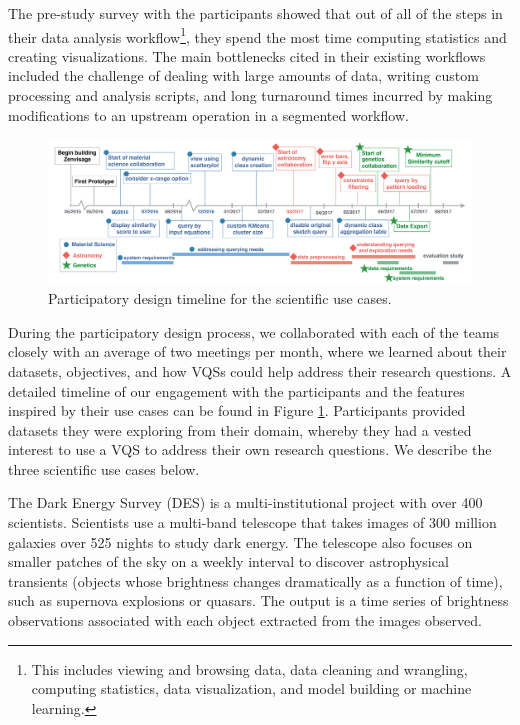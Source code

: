 \noindent The pre-study survey with the participants showed that out of all of the steps in their data analysis workflow\footnote{This includes viewing and browsing data, data cleaning and wrangling, computing statistics, data visualization, and model building or machine learning.}, they spend the most time computing statistics and creating visualizations.
The main bottlenecks cited in their existing workflows included the challenge of dealing with large amounts of data, writing custom processing and analysis scripts, and long turnaround times incurred by making modifications to an upstream operation in a segmented workflow. %
\begin{figure}[ht!]
\centering
\vspace{-10pt}
\includegraphics[width=6in]{figures/timeline_new.pdf}
\vspace{-6pt}\caption{Participatory design timeline for the scientific use cases.}
\label{timeline}
\vspace{-10pt}
\end{figure}
\par During the participatory design process, we collaborated with each of the teams closely with an average of two meetings per month, where we learned about their datasets, objectives, and how VQSs could help address their research questions. A detailed timeline of our engagement with the participants and the features inspired by their use cases can be found in Figure \ref{timeline}. Participants provided datasets they were exploring from their domain, whereby they had a vested interest to use a VQS to address their own research questions. We  describe the three scientific use cases below.

 The Dark Energy Survey (DES) is a multi-institutional project with over 400 scientists. Scientists use a multi-band telescope that takes images of 300 million galaxies over 525 nights to study dark energy\cite{Drlica-Wagner2017}. The telescope also focuses on smaller patches of the sky on a weekly interval to discover astrophysical transients (objects whose brightness changes dramatically as a function of time), such as supernova explosions or quasars. The output is a time series of brightness observations associated with each object extracted from the images observed. %

